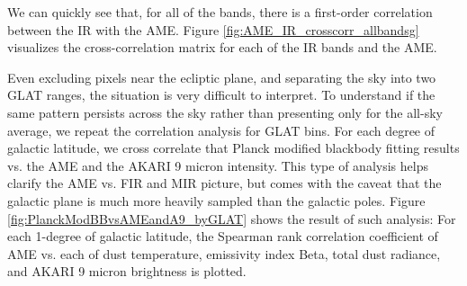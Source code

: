 \documentclass[preprint2,longabstract]{aastex}
\begin{document}
    We can quickly see that, for all of the bands, there is a first-order correlation between the IR with the AME. Figure \ref{fig:AME_IR_crosscorr_allbandsg} visualizes the cross-correlation matrix for each of the IR bands and the AME.

    Even excluding pixels near the ecliptic plane, and separating the sky into two GLAT ranges, the situation is very difficult to interpret. To understand if the same pattern persists across the sky rather than presenting only for the all-sky average, we repeat the correlation analysis for GLAT bins. For each degree of galactic latitude, we cross correlate that Planck modified blackbody fitting results vs. the AME and the AKARI 9 micron intensity. This type of analysis helps clarify the AME vs. FIR and MIR picture, but comes with the caveat that the galactic plane is much more heavily sampled than the galactic poles. Figure \ref{fig:PlanckModBBvsAMEandA9_byGLAT} shows the result of such analysis: For each 1-degree of galactic latitude, the Spearman rank correlation coefficient of AME vs. each of dust temperature, emissivity index Beta, total dust radiance, and AKARI 9 micron brightness is plotted.



\end{document}
